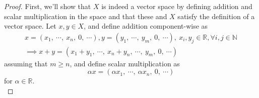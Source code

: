 \documentclass{article}
\newcommand{\parens}[1]{\left(#1\right)}
\newcommand{\R}{\mathbb{R}}
\newcommand{\N}{\mathbb{N}}
\begin{document}
    \begin{proof}
    First, we'll show that $X$ is indeed a vector space by defining 
    addition and scalar multiplication in the space and that these 
    and $X$
    satisfy the definition of a vector space. Let $x, y \in X$, and 
    define addition component-wise as 
    \begin{gather*}
    x = \parens{x_1,\ \cdots,\ x_n,\ 0,\ \cdots}, y = \parens{y_1,
    \ \cdots,\ y_m,\ 0,\ \cdots},\ x_i, y_j \in \R, \forall i,j \in 
    \N\\
    \implies x+y = \parens{x_1 + y_1,\ \cdots,\ x_n + y_n,\ 
    \cdots,\ y_m,\ 0,\ \cdots}
    \end{gather*}
    assuming that $m \geq n$, and define scalar multiplication as
    $$\alpha x = \parens{\alpha x_1,\ \cdots,\ \alpha x_n,\ 
    0,\ \cdots}$$
    for $\alpha \in \R$.\\
    

\end{proof}
\end{document}
